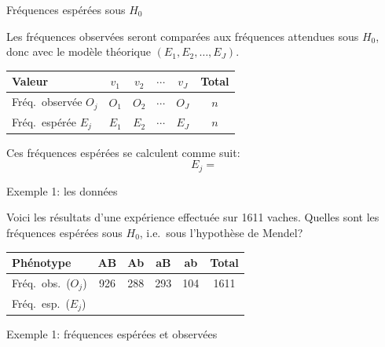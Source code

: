 \documentclass{BeamerTemplate}
\begin{document}
\begin{frame}[t]{Fréquences espérées sous $H_0$}

Les fréquences observées seront comparées aux fréquences attendues sous $H_0$,
donc avec le modèle théorique $(E_1,E_2,\ldots,E_J)$.

\bigskip
\begin{center}
\renewcommand{\arraystretch}{1.4}
\begin{tabular}{l|cccc|c}
Valeur & $v_1$ & $v_2$ & $\cdots$ & $v_J$ & Total\\
\hline
Fréq.\ observée $O_j$ & $O_1$ & $O_2$ & $\cdots$ & $O_J$ & $n$\\
Fréq.\ espérée $E_j$ & $E_1$ & $E_2$ & $\cdots$ & $E_J$ & $n$\\
\end{tabular}
\end{center}

\bigskip
Ces fréquences espérées se calculent comme suit:
\[
E_j = 
\]

\end{frame}

\begin{frame}[t]{Exemple 1: les données}

Voici les résultats d'une expérience effectuée sur 1611 vaches. Quelles sont les
fréquences espérées sous $H_0$, i.e.\ sous l'hypothèse de Mendel?

\bigskip
\begin{center}
\renewcommand{\arraystretch}{1.6}
\begin{tabular}{l|cccc|c}
Phénotype & AB & Ab & aB & ab & Total\\
\hline
Fréq.\ obs.\ ($O_j$) & 926 & 288 & 293 & 104 & 1611\\
Fréq.\ esp.\ ($E_j$) & \hspace{1.2cm} & \hspace{1.2cm} & \hspace{1.2cm}
  & \hspace{1.2cm} & \\
\end{tabular}
\end{center}

\end{frame}

\begin{frame}[t]{Exemple 1: fréquences espérées et observées}

\begin{center}
\end{center}

\end{frame}
\end{document}
